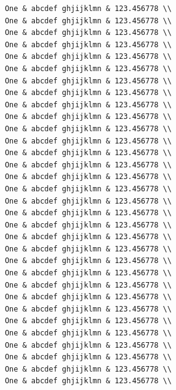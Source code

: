 \begin{enumerate}
\begin{verbatim}
			One & abcdef ghjijklmn & 123.456778 \\
			One & abcdef ghjijklmn & 123.456778 \\
			One & abcdef ghjijklmn & 123.456778 \\
			One & abcdef ghjijklmn & 123.456778 \\
			One & abcdef ghjijklmn & 123.456778 \\
			One & abcdef ghjijklmn & 123.456778 \\
			One & abcdef ghjijklmn & 123.456778 \\
			One & abcdef ghjijklmn & 123.456778 \\
			One & abcdef ghjijklmn & 123.456778 \\
			One & abcdef ghjijklmn & 123.456778 \\
			One & abcdef ghjijklmn & 123.456778 \\
			One & abcdef ghjijklmn & 123.456778 \\
			One & abcdef ghjijklmn & 123.456778 \\
			One & abcdef ghjijklmn & 123.456778 \\
			One & abcdef ghjijklmn & 123.456778 \\
			One & abcdef ghjijklmn & 123.456778 \\
			One & abcdef ghjijklmn & 123.456778 \\
			One & abcdef ghjijklmn & 123.456778 \\
			One & abcdef ghjijklmn & 123.456778 \\
			One & abcdef ghjijklmn & 123.456778 \\
			One & abcdef ghjijklmn & 123.456778 \\
			One & abcdef ghjijklmn & 123.456778 \\
			One & abcdef ghjijklmn & 123.456778 \\
			One & abcdef ghjijklmn & 123.456778 \\
			One & abcdef ghjijklmn & 123.456778 \\
			One & abcdef ghjijklmn & 123.456778 \\
			One & abcdef ghjijklmn & 123.456778 \\
			One & abcdef ghjijklmn & 123.456778 \\
			One & abcdef ghjijklmn & 123.456778 \\
			One & abcdef ghjijklmn & 123.456778 \\
			One & abcdef ghjijklmn & 123.456778 \\
			One & abcdef ghjijklmn & 123.456778 \\

\end{verbatim}
\end{enumerate}
